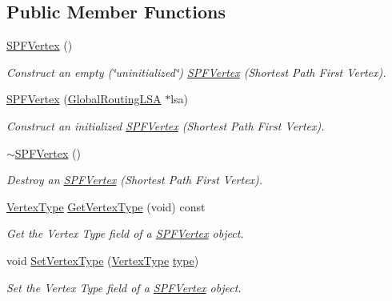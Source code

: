 \subsection*{Public Member Functions}
\begin{DoxyCompactItemize}
\item 
\hyperlink{classns3_1_1SPFVertex_af9b97ef620c4e53fa8632efb4d7d6b69}{S\+P\+F\+Vertex} ()
\begin{DoxyCompactList}\small\item\em Construct an empty (\char`\"{}uninitialized\char`\"{}) \hyperlink{classns3_1_1SPFVertex}{S\+P\+F\+Vertex} (Shortest Path First Vertex). \end{DoxyCompactList}\item 
\hyperlink{classns3_1_1SPFVertex_a44ad804fd17d8472216be5a3d4962df3}{S\+P\+F\+Vertex} (\hyperlink{classns3_1_1GlobalRoutingLSA}{Global\+Routing\+L\+SA} $\ast$lsa)
\begin{DoxyCompactList}\small\item\em Construct an initialized \hyperlink{classns3_1_1SPFVertex}{S\+P\+F\+Vertex} (Shortest Path First Vertex). \end{DoxyCompactList}\item 
\hyperlink{classns3_1_1SPFVertex_a64d4e1f12019e9af4cf27afe23d2f5a6}{$\sim$\+S\+P\+F\+Vertex} ()
\begin{DoxyCompactList}\small\item\em Destroy an \hyperlink{classns3_1_1SPFVertex}{S\+P\+F\+Vertex} (Shortest Path First Vertex). \end{DoxyCompactList}\item 
\hyperlink{classns3_1_1SPFVertex_a20f8a4cfc99a1b7ecd10a23151b93afd}{Vertex\+Type} \hyperlink{classns3_1_1SPFVertex_a45a6727c9e38b3a116c4b71594a9b0b2}{Get\+Vertex\+Type} (void) const 
\begin{DoxyCompactList}\small\item\em Get the Vertex Type field of a \hyperlink{classns3_1_1SPFVertex}{S\+P\+F\+Vertex} object. \end{DoxyCompactList}\item 
void \hyperlink{classns3_1_1SPFVertex_a9bbafd73fb907cd015df25beb2075f16}{Set\+Vertex\+Type} (\hyperlink{classns3_1_1SPFVertex_a20f8a4cfc99a1b7ecd10a23151b93afd}{Vertex\+Type} \hyperlink{visualizer-ideas_8txt_add98db9e15e2a58cf2b57623e7aa893a}{type})
\begin{DoxyCompactList}\small\item\em Set the Vertex Type field of a \hyperlink{classns3_1_1SPFVertex}{S\+P\+F\+Vertex} object. \end{DoxyCompactList}\item 

\end{DoxyCompactItemize}
